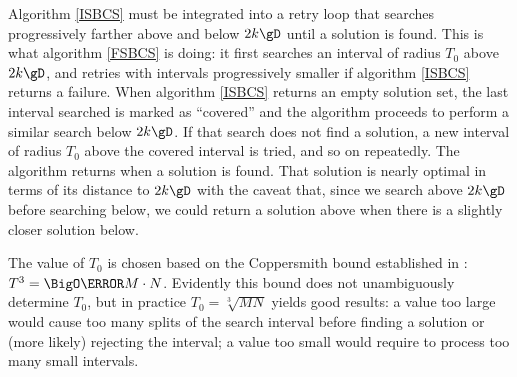 \documentclass[10pt, a4paper, twoside]{basestyle}
\begin{document}
Algorithm \ref{ISBCS} must be integrated into a retry loop that searches progressively farther above and below $2 k \gD$ until a solution is found.  This is what algorithm \ref{FSBCS} is doing: it first searches an interval of radius $T_0$ above $2 k \gD$, and retries with intervals progressively smaller if algorithm \ref{ISBCS} returns a failure.  When algorithm \ref{ISBCS} returns an empty solution set, the last interval searched is marked as ``covered'' and the algorithm proceeds to perform a similar search below $2 k \gD$.  If that search does not find a solution, a new interval of radius $T_0$ above the covered interval is tried, and so on repeatedly.  The algorithm returns when a solution is found.  That solution is nearly optimal in terms of its distance to $2 k \gD$ with the caveat that, since we search above $2 k \gD$ before searching below, we could return a solution above when there is a slightly closer solution below.

The value of $T_0$ is chosen based on the Coppersmith bound established in \cite{StehléZimmermann2005}: $T^3 = \BigO\of{M \cdot N}$.  Evidently this bound does not unambiguously determine $T_0$, but in practice $T_0 = \sqrt[3]{M N}$ yields good results: a value too large would cause too many splits of the search interval before finding a solution or (more likely) rejecting the interval; a value too small would require to process too many small intervals. 
\end{document}
